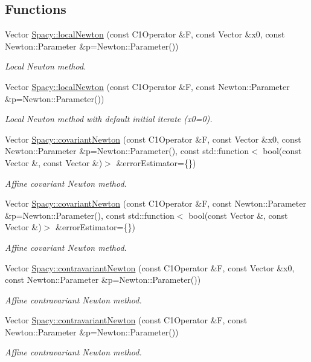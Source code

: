 \subsection*{Functions}
\begin{DoxyCompactItemize}
\item 
Vector \hyperlink{group__NewtonGroup_ga448b8e78b2e84ed78e70c42114ea7599}{Spacy\-::local\-Newton} (const C1\-Operator \&F, const Vector \&x0, const Newton\-::\-Parameter \&p=Newton\-::\-Parameter())
\begin{DoxyCompactList}\small\item\em Local Newton method. \end{DoxyCompactList}\item 
Vector \hyperlink{group__NewtonGroup_gafbe5e25f46f7b0d237f5e9971cef998a}{Spacy\-::local\-Newton} (const C1\-Operator \&F, const Newton\-::\-Parameter \&p=Newton\-::\-Parameter())
\begin{DoxyCompactList}\small\item\em Local Newton method with default initial iterate (x0=0). \end{DoxyCompactList}\item 
Vector \hyperlink{group__NewtonGroup_ga6c18ad252cb530e4f6734eb4e4fda481}{Spacy\-::covariant\-Newton} (const C1\-Operator \&F, const Vector \&x0, const Newton\-::\-Parameter \&p=Newton\-::\-Parameter(), const std\-::function$<$ bool(const Vector \&, const Vector \&)$>$ \&error\-Estimator=\{\})
\begin{DoxyCompactList}\small\item\em Affine covariant Newton method. \end{DoxyCompactList}\item 
Vector \hyperlink{group__NewtonGroup_ga2d469322482680319bf81d865ed57068}{Spacy\-::covariant\-Newton} (const C1\-Operator \&F, const Newton\-::\-Parameter \&p=Newton\-::\-Parameter(), const std\-::function$<$ bool(const Vector \&, const Vector \&)$>$ \&error\-Estimator=\{\})
\begin{DoxyCompactList}\small\item\em Affine covariant Newton method. \end{DoxyCompactList}\item 
Vector \hyperlink{group__NewtonGroup_gaa32f667c573986b2b2721ec6532fc832}{Spacy\-::contravariant\-Newton} (const C1\-Operator \&F, const Vector \&x0, const Newton\-::\-Parameter \&p=Newton\-::\-Parameter())
\begin{DoxyCompactList}\small\item\em Affine contravariant Newton method. \end{DoxyCompactList}\item 
Vector \hyperlink{group__NewtonGroup_gace045630c7f0c7a1a5a48d2d0807f608}{Spacy\-::contravariant\-Newton} (const C1\-Operator \&F, const Newton\-::\-Parameter \&p=Newton\-::\-Parameter())
\begin{DoxyCompactList}\small\item\em Affine contravariant Newton method. \end{DoxyCompactList}\end{DoxyCompactItemize}



